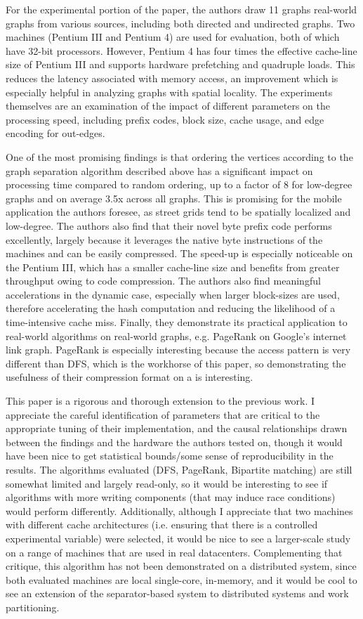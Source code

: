 For the experimental portion of the paper, the authors draw 11 graphs real-world graphs from various sources, including both directed and undirected graphs. Two machines (Pentium III and Pentium 4) are used for evaluation, both of which have 32-bit processors. However, Pentium 4 has four times the effective cache-line size of Pentium III and supports hardware prefetching and quadruple loads. This reduces the latency associated with memory access, an improvement which is especially helpful in analyzing graphs with spatial locality. The experiments themselves are an examination of the impact of different parameters on the processing speed, including prefix codes, block size, cache usage, and edge encoding for out-edges.

One of the most promising findings is that ordering the vertices according to the graph separation algorithm described above has a significant impact on processing time compared to random ordering, up to a factor of 8 for low-degree graphs and on average 3.5x across all graphs. This is promising for the mobile application the authors foresee, as street grids tend to be spatially localized and low-degree. The authors also find that their novel byte prefix code performs excellently, largely because it leverages the native byte instructions of the machines and can be easily compressed. The speed-up is especially noticeable on the Pentium III, which has a smaller cache-line size and benefits from greater throughput owing to code compression. The authors also find meaningful accelerations in the dynamic case, especially when larger block-sizes are used, therefore accelerating the hash computation and reducing the likelihood of a time-intensive cache miss. Finally, they demonstrate its practical application to real-world algorithms on real-world graphs, e.g. PageRank on Google's internet link graph. PageRank is especially interesting because the access pattern is very different than DFS, which is the workhorse of this paper, so demonstrating the usefulness of their compression format on a is interesting.

This paper is a rigorous and thorough extension to the previous work. I appreciate the careful identification of parameters that are critical to the appropriate tuning of their implementation, and the causal relationships drawn between the findings and the hardware the authors tested on, though it would have been nice to get statistical bounds/some sense of reproducibility in the results. The algorithms evaluated (DFS, PageRank, Bipartite matching) are still somewhat limited and largely read-only, so it would be interesting to see if algorithms with more writing components (that may induce race conditions) would perform differently. Additionally, although I appreciate that two machines with different cache architectures (i.e. ensuring that there is a controlled experimental variable) were selected, it would be nice to see a larger-scale study on a range of machines that are used in real datacenters. Complementing that critique, this algorithm has not been demonstrated on a distributed system, since both evaluated machines are local single-core, in-memory, and it would be cool to see an extension of the separator-based system to distributed systems and work partitioning.